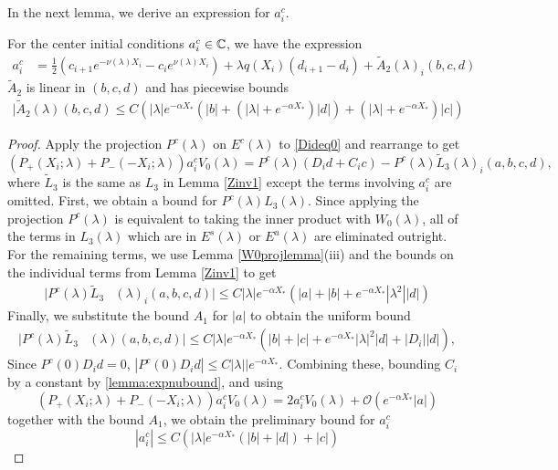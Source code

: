 \documentclass[thesis.tex]{subfiles}
\begin{document}
In the next lemma, we derive an expression for $a_i^c$.

\begin{lemma}\label{lemma:ac1}
For the center initial conditions $a_i^c \in \mathbb{C}$, we have the expression
\begin{align}\label{tildeciexp1}
a_i^c &= \frac{1}{2}\left( c_{i+1} e^{-\nu(\lambda)X_i} - c_i e^{\nu(\lambda)X_i} \right) + \lambda q(X_i) (d_{i+1} - d_i ) + \tilde{A}_2(\lambda)_i(b, c, d)
\end{align}
$\tilde{A}_2$ is linear in $(b, c, d)$ and has piecewise bounds
\begin{align}\label{tildeA2bound}
|\tilde{A}_2(\lambda)(b, c, d) \leq C \left( |\lambda| e^{-\alpha X_*} \left( |b| + (|\lambda| + e^{-\alpha X_*}) |d| \right) + (|\lambda| + e^{-\alpha X_*})|c| \right)
\end{align}

\begin{proof}
Apply the projection $P^c(\lambda)$ on $E^c(
\lambda)$ to \eqref{Dideq0} and rearrange to get  
\begin{equation}\label{PcDid}
(P_+(X_i; \lambda) + P_-(-X_i; \lambda))a_i^c V_0(\lambda) = 
P^c(\lambda)(D_i d + C_i c) - P^c(\lambda) \tilde{L}_3(\lambda)_i(a,b,c,d),
\end{equation}
where $\tilde{L}_3$ is the same as $L_3$ in Lemma \ref{Zinv1} except the terms involving $a_i^c$ are omitted. First, we obtain a bound for $P^c(\lambda)L_3(\lambda)$. Since applying the projection $P^c(\lambda)$ is equivalent to taking the inner product with $W_0(\lambda)$, all of the terms in $L_3(\lambda)$ which are in $E^s(\lambda)$ or $E^u(\lambda)$ are eliminated outright. For the remaining terms, we use Lemma \ref{W0projlemma}(iii) and the bounds on the individual terms from Lemma \ref{Zinv1} to get
\begin{align*}
|P^c(\lambda)\tilde{L}_3&(\lambda)_i(a,b,c,d)| \leq C |\lambda| e^{-\alpha X_*}  \left( |a| + |b| + e^{-\alpha X_*} |\lambda^2| |d| \right)
\end{align*}
Finally, we substitute the bound $A_1$ for $|a|$ to obtain the uniform bound  
\begin{align}\label{PcL3bound}
|P^c(\lambda)\tilde{L}_3&(\lambda)(a,b,c,d)| \leq C |\lambda| e^{-\alpha X_*}  \left( |b| + |c| + e^{-\alpha X_*} |\lambda|^2 |d| + |D_i||d| \right),
\end{align}
Since $P^c(0)D_i d = 0$, $|P^c(0)D_i d| \leq C |\lambda||e^{-\alpha X_*}$. Combining these, bounding $C_i$ by a constant by \cref{lemma:expnubound}, and using
\[
(P_+(X_i; \lambda) + P_-(-X_i; \lambda))a_i^c V_0(\lambda) = 2 a_i^c V_0(\lambda) + \mathcal{O}(e^{-\alpha X_*}|a|)
\]
together with the bound $A_1$, we obtain the preliminary bound for $a_i^c$
\begin{equation}\label{tildecbound1}
|a_i^c| \leq C \left( |\lambda| e^{-\alpha X_*}  \left( |b| + |d| \right) + |c| \right)
\end{equation}


\end{proof}
\end{lemma}
\end{document}
